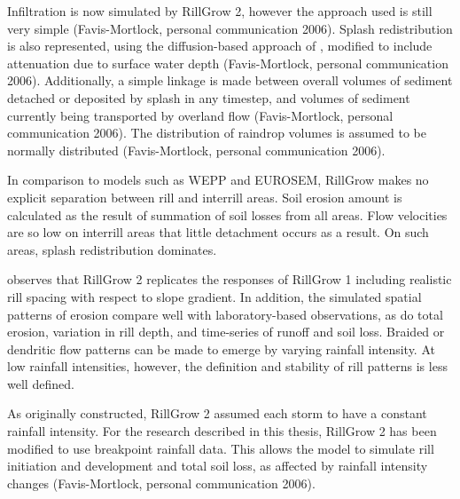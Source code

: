 Infiltration is now simulated by RillGrow 2, however the approach used is still
very simple (Favis-Mortlock, personal communication 2006). Splash redistribution
is also represented, using the diffusion-based approach of
\citet{planchon2000-131}, modified to include attenuation due to surface water
depth (Favis-Mortlock, personal communication 2006). Additionally, a simple
linkage is made between overall volumes of sediment detached or deposited by
splash in any timestep, and volumes of sediment currently being transported by
overland flow (Favis-Mortlock, personal communication 2006). The distribution of
raindrop volumes is assumed to be normally distributed (Favis-Mortlock, personal
communication 2006).

In comparison to models such as WEPP and EUROSEM, RillGrow makes no explicit
separation between rill and interrill areas. Soil erosion amount is calculated
as the result of summation of soil losses from all areas.
Flow velocities are so low on interrill areas that little detachment occurs as a
result. On such areas, splash redistribution dominates.

\citet{favis2000-2173} observes that RillGrow 2 replicates the responses of
RillGrow 1 including realistic rill spacing with respect to slope gradient. In
addition, the simulated spatial patterns of erosion compare well with
laboratory-based observations, as do total erosion, variation in rill depth, and
time-series of runoff and soil loss. Braided or dendritic flow patterns can be
made to emerge by varying rainfall intensity. At low rainfall intensities,
however, the definition and stability of rill patterns is less well defined.

As originally constructed, RillGrow 2 assumed each storm to have a constant
rainfall intensity. For the research described in this thesis, RillGrow 2 has
been modified to use breakpoint rainfall data. This allows the model to simulate
rill initiation and development and total soil loss, as affected by rainfall
intensity changes (Favis-Mortlock, personal communication 2006).
